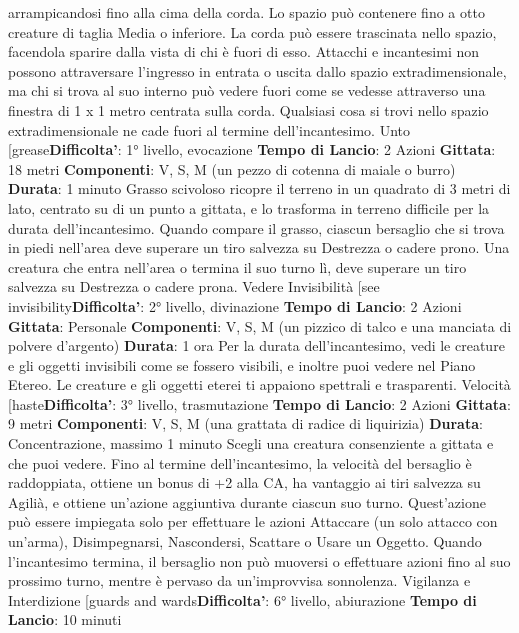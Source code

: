 \begin{multicols}{2}
arrampicandosi fino alla cima della corda. Lo spazio
può contenere fino a otto creature di taglia Media o
inferiore. La corda può essere trascinata nello spazio,
facendola sparire dalla vista di chi è fuori di esso.
Attacchi e incantesimi non possono attraversare
l’ingresso in entrata o uscita dallo spazio
extradimensionale, ma chi si trova al suo interno può
vedere fuori come se vedesse attraverso una finestra di
1 x 1 metro centrata sulla corda.
Qualsiasi cosa si trovi nello spazio extradimensionale
ne cade fuori al termine dell’incantesimo.
Unto
[grease\textbf{Difficolta'}:
1° livello, evocazione
\textbf{Tempo di Lancio}: 2 Azioni
\textbf{Gittata}: 18 metri
\textbf{Componenti}: V, S, M (un pezzo di cotenna di maiale o
burro)
\textbf{Durata}: 1 minuto
Grasso scivoloso ricopre il terreno in un quadrato di 3
metri di lato, centrato su di un punto a gittata, e lo
trasforma in terreno difficile per la durata
dell’incantesimo.
Quando compare il grasso, ciascun bersaglio che si
trova in piedi nell’area deve superare un tiro salvezza
su Destrezza o cadere prono. Una creatura che entra
nell’area o termina il suo turno lì, deve superare un tiro
salvezza su Destrezza o cadere prona.
Vedere Invisibilità
[see invisibility\textbf{Difficolta'}:
2° livello, divinazione
\textbf{Tempo di Lancio}: 2 Azioni
\textbf{Gittata}: Personale
\textbf{Componenti}: V, S, M (un pizzico di talco e una
manciata di polvere d’argento)
\textbf{Durata}: 1 ora
Per la durata dell’incantesimo, vedi le creature e gli
oggetti invisibili come se fossero visibili, e inoltre puoi
vedere nel Piano Etereo. Le creature e gli oggetti eterei
ti appaiono spettrali e trasparenti.
Velocità
[haste\textbf{Difficolta'}:
3° livello, trasmutazione
\textbf{Tempo di Lancio}: 2 Azioni
\textbf{Gittata}: 9 metri
\textbf{Componenti}: V, S, M (una grattata di radice di
liquirizia)
\textbf{Durata}: Concentrazione, massimo 1 minuto
Scegli una creatura consenziente a gittata e che puoi
vedere. Fino al termine dell’incantesimo, la velocità del
bersaglio è raddoppiata, ottiene un bonus di +2 alla CA,
ha vantaggio ai tiri salvezza su Agilià, e ottiene
un’azione aggiuntiva durante ciascun suo turno.
Quest’azione può essere impiegata solo per effettuare
le azioni Attaccare (un solo attacco con un’arma),
Disimpegnarsi, Nascondersi, Scattare o Usare un
Oggetto.
Quando l’incantesimo termina, il bersaglio non può
muoversi o effettuare azioni fino al suo prossimo turno,
mentre è pervaso da un’improvvisa sonnolenza.
Vigilanza e Interdizione
[guards and wards\textbf{Difficolta'}:
6° livello, abiurazione
\textbf{Tempo di Lancio}: 10 minuti

\end{multicols}

